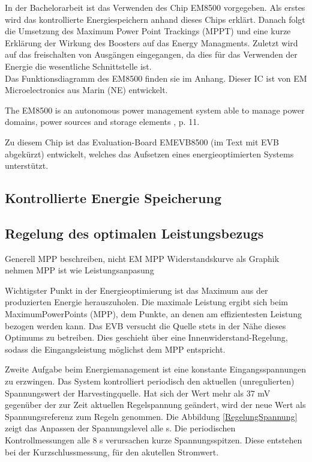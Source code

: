 In der Bachelorarbeit ist das Verwenden des Chip EM8500 vorgegeben. Als erstes wird das kontrollierte Energiespeichern anhand dieses Chips erklärt. Danach folgt die Umsetzung des Maximum Power Point Trackings (MPPT) und eine kurze Erklärung der Wirkung des Boosters auf das Energy Managments. Zuletzt wird auf das freischalten von Ausgängen eingegangen, da dies für das Verwenden der Energie die wesentliche Schnittstelle ist.\\

Das Funktionsdiagramm des EM8500 finden sie im Anhang. Dieser IC ist von EM Microelectronics aus Marin (NE) entwickelt. 

The EM8500 is an autonomous power management system able to manage power domains, power sources and storage elements \cite{datasheet_EM85}, p. 11.

Zu diesem Chip ist das Evaluation-Board EMEVB8500 (im Text mit EVB abgekürzt) entwickelt, welches das Aufsetzen eines energieoptimierten Systems unterstützt. 

\subsection{Kontrollierte Energie Speicherung}



\subsection{Regelung des optimalen Leistungsbezugs}

Generell MPP beschreiben, nicht EM MPP
Widerstandskurve als Graphik nehmen
MPP ist wie Leistungsanpasung

Wichtigster Punkt in der Energieoptimierung ist das Maximum aus der produzierten Energie herauszuholen. Die maximale Leistung ergibt sich beim MaximumPowerPoints (MPP), dem Punkte, an denen am effizientesten Leistung bezogen werden kann. 
Das EVB versucht die Quelle stets in der Nähe dieses Optimums zu betreiben. Dies geschieht über eine Innenwiderstand-Regelung, sodass die Eingangsleistung möglichst dem MPP entspricht.

Zweite Aufgabe beim Energiemanagement ist eine konstante Eingangsspannungen zu erzwingen. Das System kontrolliert periodisch den aktuellen (unregulierten) Spannungswert der Harvestingquelle. Hat sich der Wert mehr als 37 mV gegenüber der zur Zeit aktuellen Regelspannung geändert, wird der neue Wert als Spannungsreferenz zum Regeln genommen. Die Abbildung \ref{RegelungSpannung} zeigt das Anpassen der Spannungslevel alle s. Die periodischen Kontrollmessungen alle 8 s verursachen kurze Spannungsspitzen. Diese entstehen bei der Kurzschlussmessung, für den akutellen Stromwert.



